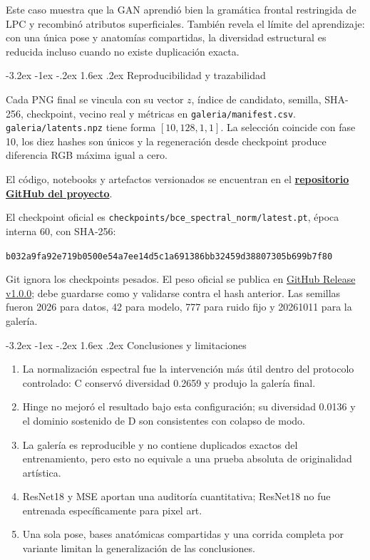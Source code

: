 \documentclass[11pt]{article}
\makeatletter
\renewcommand\section{\@startsection{section}{1}{\z@}%
  {-3.2ex \@plus -1ex \@minus -.2ex}%
  {1.6ex \@plus .2ex}%
  {\normalfont\Large\bfseries\color{DeepPurple}}}
\makeatother
\begin{document}
Este caso muestra que la GAN aprendió bien la gramática frontal restringida de LPC y recombinó atributos superficiales. También revela el límite del aprendizaje: con una única pose y anatomías compartidas, la diversidad estructural es reducida incluso cuando no existe duplicación exacta.

\section{Reproducibilidad y trazabilidad}

Cada PNG final se vincula con su vector $z$, índice de candidato, semilla, SHA-256, checkpoint, vecino real y métricas en \texttt{galeria/manifest.csv}. \texttt{galeria/latents.npz} tiene forma $[10,128,1,1]$. La selección coincide con fase 10, los diez hashes son únicos y la regeneración desde checkpoint produce diferencia RGB máxima igual a cero.

El código, notebooks y artefactos versionados se encuentran en el \href{https://github.com/DanielBarillasM/Proyecto-2_Grupo-1_DLYSI_Sec-30.git}{\textbf{repositorio GitHub del proyecto}}.

El checkpoint oficial es \texttt{checkpoints/bce\_spectral\_norm/latest.pt}, época interna 60, con SHA-256:

\begin{center}
\small\texttt{b032a9fa92e719b0500e54a7ee14d5c1a691386bb32459d38807305b699b7f80}
\end{center}

Git ignora los checkpoints pesados. El peso oficial se publica en \href{https://github.com/DanielBarillasM/Proyecto-2_Grupo-1_DLYSI_Sec-30/releases/download/v1.0.0/latest.pt}{GitHub Release v1.0.0}; debe guardarse como  y validarse contra el hash anterior. Las semillas fueron 2026 para datos, 42 para modelo, 777 para ruido fijo y 20261011 para la galería.

\section{Conclusiones y limitaciones}

\begin{enumerate}
  \item La normalización espectral fue la intervención más útil dentro del protocolo controlado: C conservó diversidad 0.2659 y produjo la galería final.
  \item Hinge no mejoró el resultado bajo esta configuración; su diversidad 0.0136 y el dominio sostenido de D son consistentes con colapso de modo.
  \item La galería es reproducible y no contiene duplicados exactos del entrenamiento, pero esto no equivale a una prueba absoluta de originalidad artística.
  \item ResNet18 y MSE aportan una auditoría cuantitativa; ResNet18 no fue entrenada específicamente para pixel art.
  \item Una sola pose, bases anatómicas compartidas y una corrida completa por variante limitan la generalización de las conclusiones.
\end{enumerate}
\end{document}
